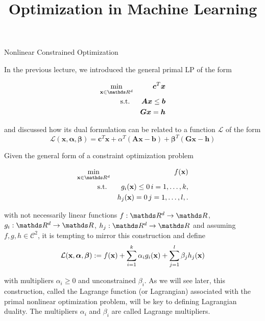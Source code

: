 \documentclass[11pt,compress,t,notes=noshow, xcolor=table]{beamer}
\title{Optimization in Machine Learning}
\date{}
\begin{document}
\sloppy
\begin{vbframe}{Nonlinear Constrained Optimization}

In the previous lecture, we introduced the general primal LP of the form 

\begin{eqnarray*}
 \min_{\xv \in \R^d} && \bm{c}^T\bm{x} \\
\text{s.t. } &&  \bm{A} \bm{x} \le \bm{b}\\
             && \bm{G} \bm{x} = \bm{h} 
\end{eqnarray*}

and discussed how its dual formulation can be related to a function $\mathcal{L}$ of the form 
$$
\mathcal{L}(\bm{x},\bm{\alpha},\bm{\beta}) = \bm{c}^T \bm{x} + \alpha^T (\bm{A} \bm{x} - \bm{b}) + \bm{\beta}^T (\bm{G} \bm{x} - \bm{h}) 
$$

\framebreak

Given the general form of a constraint optimization problem

\begin{eqnarray*}
 \min_{\xv \in \R^d} && f(\xv) \\
\text{s.t. } && g_i(\xv) \le 0 \, i=1,\ldots, k, \\
             && h_j(\xv) = 0 \, j=1,\ldots, l,.\\
\end{eqnarray*}

with not necessarily linear functions $f:\R^d \to \R$, $g_i:\R^d \to \R$, $h_j:\R^d \to \R$ and assuming $f, g, h \in \mathcal{C}^2$, it is tempting to mirror this construction and define  
$$
\mathcal{L}(\mathbf{x}, \bm{\alpha}, \bm{\beta}) := f(\mathbf{x}) + \sum_{i=1}^k \alpha_i g_i(\mathbf{x}) + \sum_{j=1}^l \beta_j h_j(\mathbf{x})
$$

with  multipliers $\alpha_i\ge 0$ and unconstrained $\beta_i$. As we will see later, this construction, called the Lagrange function (or Lagrangian) associated with the primal nonlinear optimization problem, will be key to defining Lagrangian duality. The multipliers $\alpha_i$ and $\beta_i$ are called Lagrange multipliers.   

\end{vbframe}
\end{document}
